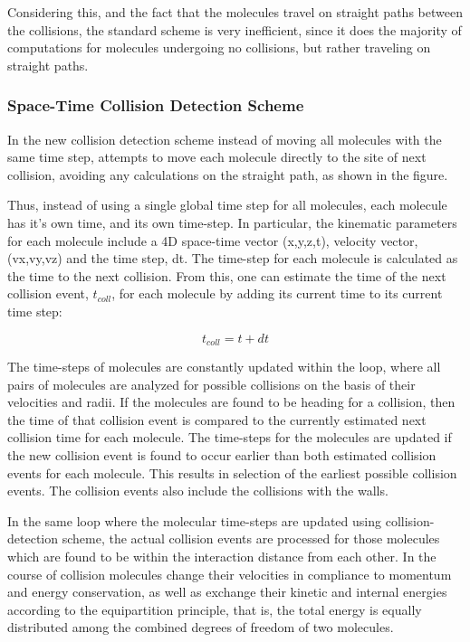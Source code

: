 Considering this, and the fact that the molecules travel on straight paths between the collisions, the standard scheme is very inefficient, since it does the majority of computations for molecules undergoing no collisions, but rather traveling on straight paths.\hypertarget{Implementation_STDetAlg}{}\subsubsection{Space-Time Collision Detection Scheme}\label{Implementation_STDetAlg}
In the new collision detection scheme instead of moving all molecules with the same time step, attempts to move each molecule directly to the site of next collision, avoiding any calculations on the straight path, as shown in the figure.



Thus, instead of using a single global time step for all molecules, each molecule has it's own time, and its own time-step. In particular, the kinematic parameters for each molecule include a 4D space-time vector (x,y,z,t), velocity vector, (vx,vy,vz) and the time step, dt. The time-step for each molecule is calculated as the time to the next collision. From this, one can estimate the time of the next collision event, $t_{coll}$, for each molecule by adding its current time to its current time step:

\[ t_{coll} = t + dt \]

The time-steps of molecules are constantly updated within the loop, where all pairs of molecules are analyzed for possible collisions on the basis of their velocities and radii. If the molecules are found to be heading for a collision, then the time of that collision event is compared to the currently estimated next collision time for each molecule. The time-steps for the molecules are updated if the new collision event is found to occur earlier than both estimated collision events for each molecule. This results in selection of the earliest possible collision events. The collision events also include the collisions with the walls.

In the same loop where the molecular time-steps are updated using collision-detection scheme, the actual collision events are processed for those molecules which are found to be within the interaction distance from each other. In the course of collision molecules change their velocities in compliance to momentum and energy conservation, as well as exchange their kinetic and internal energies according to the equipartition principle, that is, the total energy is equally distributed among the combined degrees of freedom of two molecules.

